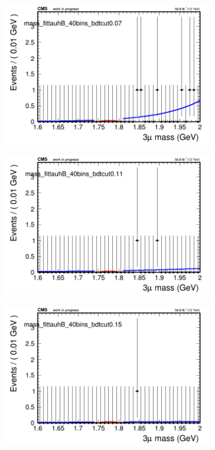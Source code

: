 \begin{figure}[H]
\begin{subfigure}{0.2\textwidth}
        \includegraphics[width=\textwidth]{unfixed_exp/plots/tauhB/massfit_tauhB_40bins_bdtcut0.07.png}
        \caption{}
    \end{subfigure}
    \begin{subfigure}{0.2\textwidth}
        \includegraphics[width=\textwidth]{unfixed_exp/plots/tauhB/massfit_tauhB_40bins_bdtcut0.11.png}
        \caption{}
    \end{subfigure}
    \begin{subfigure}{0.2\textwidth}
        \includegraphics[width=\textwidth]{unfixed_exp/plots/tauhB/massfit_tauhB_40bins_bdtcut0.15.png}

\end{subfigure}
\end{figure}
